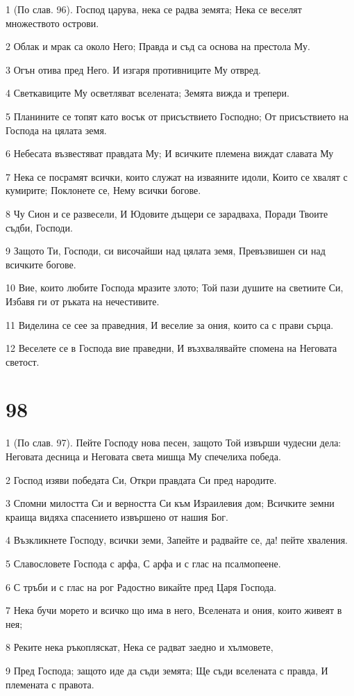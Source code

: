 \par 1 (По слав. 96). Господ царува, нека се радва земята; Нека се веселят множеството острови.
\par 2 Облак и мрак са около Него; Правда и съд са основа на престола Му.
\par 3 Огън отива пред Него. И изгаря противниците Му отвред.
\par 4 Светкавиците Му осветляват вселената; Земята вижда и трепери.
\par 5 Планините се топят като восък от присъствието Господно; От присъствието на Господа на цялата земя.
\par 6 Небесата възвестяват правдата Му; И всичките племена виждат славата Му
\par 7 Нека се посрамят всички, които служат на изваяните идоли, Които се хвалят с кумирите; Поклонете се, Нему всички богове.
\par 8 Чу Сион и се развесели, И Юдовите дъщери се зарадваха, Поради Твоите съдби, Господи.
\par 9 Защото Ти, Господи, си височайши над цялата земя, Превъзвишен си над всичките богове.
\par 10 Вие, които любите Господа мразите злото; Той пази душите на светиите Си, Избавя ги от ръката на нечестивите.
\par 11 Виделина се сее за праведния, И веселие за ония, които са с прави сърца.
\par 12 Веселете се в Господа вие праведни, И възхвалявайте спомена на Неговата светост.

\chapter{98}

\par 1 (По слав. 97). Пейте Господу нова песен, защото Той извърши чудесни дела: Неговата десница и Неговата света мишца Му спечелиха победа.
\par 2 Господ изяви победата Си, Откри правдата Си пред народите.
\par 3 Спомни милостта Си и верността Си към Израилевия дом; Всичките земни краища видяха спасението извършено от нашия Бог.
\par 4 Възкликнете Господу, всички земи, Запейте и радвайте се, да! пейте хваления.
\par 5 Славословете Господа с арфа, С арфа и с глас на псалмопеене.
\par 6 С тръби и с глас на рог Радостно викайте пред Царя Господа.
\par 7 Нека бучи морето и всичко що има в него, Вселената и ония, които живеят в нея;
\par 8 Реките нека ръкопляскат, Нека се радват заедно и хълмовете,
\par 9 Пред Господа; защото иде да съди земята; Ще съди вселената с правда, И племената с правота.

